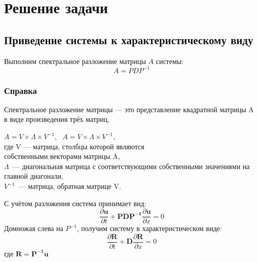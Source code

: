 \documentclass[a4paper,14pt]{article}
\begin{document}
    \section{Решение задачи}
    \subsection{Приведение системы к характеристическому виду}
    Выполним спектральное разложение матрицы $A$ системы:
    \begin{equation}
    A=P D P^{-1}
    \end{equation}
    \vspace{0.5cm}
    \subsubsection{Справка}
        Спектральное разложение матрицы — это представление квадратной матрицы A в виде произведения трёх матриц,\\
        \begin{center}
    $A=V\times{\Lambda}\times{V^{-1}}$, \ $A=V\times{\Lambda}\times{V^{-1}}$,\\ где V — матрица, столбцы которой являются\\ собственными векторами матрицы  A,\\ $\Lambda$\ — диагональная матрица с соответствующими собственными значениями на главной диагонали,\\ $V^{-1}$\ — матрица, обратная матрице V.\\
    \end{center}
    \vspace{0.5cm}
    С учётом разложения система принимает вид:
    \begin{equation}
    \frac{\partial \mathbf{u}}{\partial t}+\mathbf{P D P^{-1}} \frac{\partial \mathbf{u}}{\partial x}=0
    \end{equation}
    \vspace{0.5cm}
    Домножая слева на $P^{-1}$, получим систему в характеристическом виде:
    \begin{equation}
    \frac{\partial \mathbf{R}}{\partial t}+\mathbf{D} \frac{\partial \mathbf{R}}{\partial x}=0
    \end{equation}
    где $\mathbf{R}=\mathbf{P^{-1}u}$
    \vspace{0.5cm}
\end{document}
